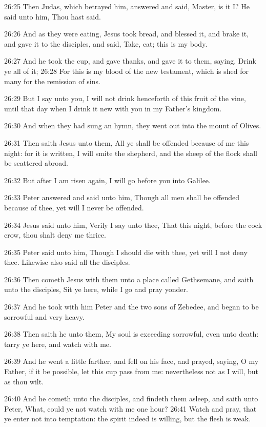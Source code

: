 26:25 Then Judas, which betrayed him, answered and said, Master, is it I?  He said unto him, Thou hast said.

26:26 And as they were eating, Jesus took bread, and blessed it, and brake it, and gave it to the disciples, and said, Take, eat; this is my body.

26:27 And he took the cup, and gave thanks, and gave it to them, saying, Drink ye all of it; 26:28 For this is my blood of the new testament, which is shed for many for the remission of sins.

26:29 But I say unto you, I will not drink henceforth of this fruit of the vine, until that day when I drink it new with you in my Father's kingdom.

26:30 And when they had sung an hymn, they went out into the mount of Olives.

26:31 Then saith Jesus unto them, All ye shall be offended because of me this night: for it is written, I will smite the shepherd, and the sheep of the flock shall be scattered abroad.

26:32 But after I am risen again, I will go before you into Galilee.

26:33 Peter answered and said unto him, Though all men shall be offended because of thee, yet will I never be offended.

26:34 Jesus said unto him, Verily I say unto thee, That this night, before the cock crow, thou shalt deny me thrice.

26:35 Peter said unto him, Though I should die with thee, yet will I not deny thee. Likewise also said all the disciples.

26:36 Then cometh Jesus with them unto a place called Gethsemane, and saith unto the disciples, Sit ye here, while I go and pray yonder.

26:37 And he took with him Peter and the two sons of Zebedee, and began to be sorrowful and very heavy.

26:38 Then saith he unto them, My soul is exceeding sorrowful, even unto death: tarry ye here, and watch with me.

26:39 And he went a little farther, and fell on his face, and prayed, saying, O my Father, if it be possible, let this cup pass from me: nevertheless not as I will, but as thou wilt.

26:40 And he cometh unto the disciples, and findeth them asleep, and saith unto Peter, What, could ye not watch with me one hour?  26:41 Watch and pray, that ye enter not into temptation: the spirit indeed is willing, but the flesh is weak.

